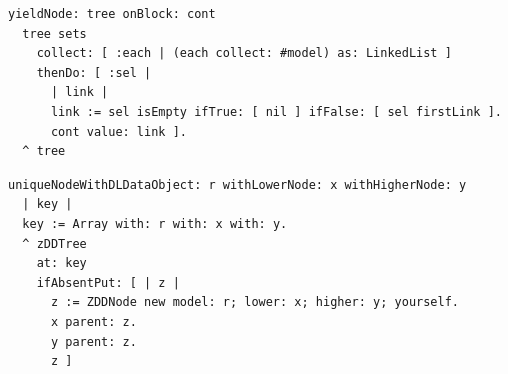\documentclass{beamer}
\begin{document}
\begin{frame}[fragile]
\begin{verbatim}
yieldNode: tree onBlock: cont
  tree sets
    collect: [ :each | (each collect: #model) as: LinkedList ]
    thenDo: [ :sel | 
      | link |
      link := sel isEmpty ifTrue: [ nil ] ifFalse: [ sel firstLink ].
      cont value: link ].
  ^ tree
\end{verbatim}
\vfill
\begin{verbatim}
uniqueNodeWithDLDataObject: r withLowerNode: x withHigherNode: y
  | key |
  key := Array with: r with: x with: y.
  ^ zDDTree
    at: key
    ifAbsentPut: [ | z |
      z := ZDDNode new model: r; lower: x; higher: y; yourself.
      x parent: z.
      y parent: z.
      z ]
\end{verbatim}
\end{frame}
\end{document}

